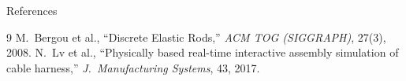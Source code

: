 \documentclass[aspectratio=169]{beamer}
\begin{document}
\begin{frame}[noframenumbering]{References}
\small
\begin{thebibliography}{9}
 M.~Bergou et al.,
``Discrete Elastic Rods,'' \textit{ACM TOG (SIGGRAPH)}, 27(3), 2008.
 N.~Lv et al.,
``Physically based real-time interactive assembly simulation of cable harness,''
\textit{J.\ Manufacturing Systems}, 43, 2017.
\end{thebibliography}
\end{frame}
\end{document}
